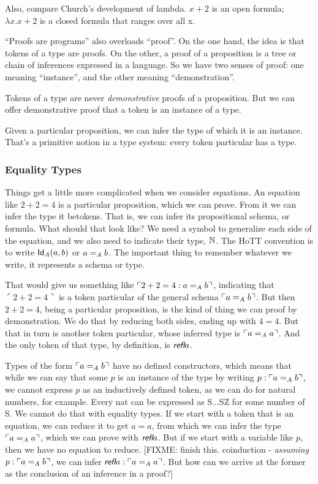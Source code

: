 \documentclass{article}
\begin{document}
Also, compare Church's development of lambda. \(x+2\) is an open
formula; \(\lambda x.x+2\) is a closed formula that ranges over all x.

``Proofs are programs'' also overloads ``proof''. On the one hand, the
idea is that tokens of a type are proofs. On the other, a proof of a
proposition is a tree or chain of inferences expressed in a language.
So we have two senses of proof: one meaning ``instance'', and the
other meaning ``demonstration''.

Tokens of a type are never \textit{demonstrative} proofs of a
proposition. But we can offer demonstrative proof that a token is an
instance of a type.

Given a particular proposition, we can infer the type of which it is
an instance. That's a primitive notion in a type system: every token
particular has a type.

\subsubsection{Equality Types}

Things get a little more complicated when we consider equations. An
equation like \(2+2=4\) is a particular proposition, which we can
prove. From it we can infer the type it betokens. That is, we can
infer its propositional schema, or formula. What should that look
like? We need a symbol to generalize each side of the equation, and we
also need to indicate their type, \(\Nat\). The HoTT convention is to
write \(\Id{A}{a}{b}\) or \(\Eq{A}{a}{b}\). The important thing to
remember whatever we write, it represents a schema or type.

That would give us something like \(\ulcorner 2+2=4 :
\Eq{A}{a}{b}\urcorner\), indicating that \(\ulcorner 2+2=4\urcorner\)
is a token particular of the general schema
\(\ulcorner\Eq{A}{a}{b}\urcorner\). But then \(2+2=4\), being a
particular proposition, is the kind of thing we can proof by
demonstration. We do that by reducing both sides, ending up with
\(4=4\). But that in turn is another token particular, whose inferred
type is \(\ulcorner\Eq{A}{a}{a}\urcorner\). And the only token of that
type, by definition, is \(\refl{a}\).

Types of the form \(\ulcorner\Eq{A}{a}{b}\urcorner\) have no defined
constructors, which means that while we can say that some \(p\) is an
instance of the type by writing \(p:\ulcorner\Eq{A}{a}{b}\urcorner\),
we cannot express \(p\) as an inductively defined token, as we can do
for natural numbers, for example. Every nat can be expressed as S...SZ
for some number of S. We cannot do that with equality types. If we
start with a token that is an equation, we can reduce it to get
\(a=a\), from which we can infer the type
\(\ulcorner\Eq{A}{a}{a}\urcorner\), which we can prove with
\(\refl{a}\). But if we start with a variable like \(p\), then we have
no equation to reduce. [FIXME: finish this. coinduction -
  \textit{assuming} \(p:\ulcorner\Eq{A}{a}{b}\urcorner\), we can infer
  \(\refl{a}:\ulcorner\Eq{A}{a}{a}\urcorner\). But how can we arrive
  at the former as the conclusion of an inference in a proof?]
\end{document}
